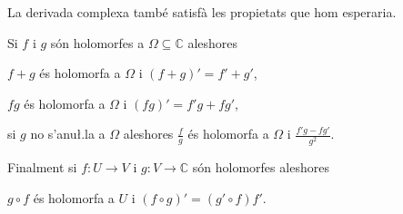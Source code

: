 \documentclass[12pt,twoside]{report}
\numberwithin{table}{section}
\numberwithin{equation}{section}
\numberwithin{figure}{section}
\newcommand{\C}{\ensuremath{\mathbb{C}}}
\begin{document}
La derivada complexa també satisfà les propietats que hom esperaria.
\begin{prop}
	Si \( f \) i \( g \) són holomorfes a \( \Omega \subseteq \C \) aleshores
	\begin{punts}
	\item \( f + g \) és holomorfa a \( \Omega \) i \( (f + g)' = f' + g' \),
	\item \( fg \) és holomorfa a \( \Omega \) i \( (fg)' = f'g + fg' \),
	\item	si \( g \) no s'anu\l.la a \( \Omega \) aleshores \( \frac{f}{g} \) és holomorfa a \( \Omega \) i \( \frac{f'g - fg'}{g^2} \).
	\end{punts}
	Finalment si \( f \colon U \to V \) i \( g \colon V \to \C \) són holomorfes aleshores 
	\begin{punts}[resume]
	\item \( g \circ f \) és holomorfa a \( U \) i \( (f \circ g)' = (g' \circ f)f' \).
	\end{punts}
\end{prop}
\end{document}
